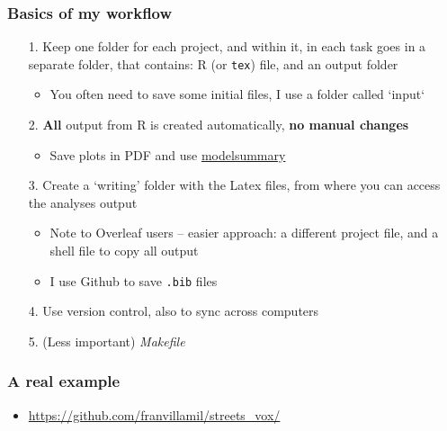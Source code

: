 \documentclass[utf8, xcolor=dvipsnames, handout]{beamer}
\begin{document}
\begin{itemize}
\begin{frame}
\end{frame}

\begin{frame}
\frametitle{Basics of my workflow}
\centering

\begin{itemize}
  \item[1.] Keep one folder for each project, and within it, in each task goes in a separate folder, that contains: R (or \texttt{tex}) file, and an output folder
  \begin{itemize}
    \item You often need to save some initial files, I use a folder called `input`
  \end{itemize}
  \item[2.] \textbf{All} output from R is created automatically, \textbf{no manual changes}
  \begin{itemize}
    \item Save plots in PDF and use \href{https://vincentarelbundock.github.io/modelsummary/articles/modelsummary.html}{modelsummary}
  \end{itemize}
  \item[3.] Create a `writing' folder with the Latex files, from where you can access the analyses output
  \begin{itemize}
    \item Note to Overleaf users -- easier approach: a different project file, and a shell file to copy all output
    \item I use Github to save \texttt{.bib} files
  \end{itemize}
  \item[4.] Use version control, also to sync across computers
  \item[5.] (Less important) \textit{Makefile}

\end{itemize}

\end{frame}

\begin{frame}
\frametitle{A real example}
\centering

\begin{itemize}
  \item \href{https://github.com/franvillamil/streets_vox/}{https://github.com/franvillamil/streets\_vox/}
\end{itemize}


\end{frame}
\end{itemize}
\end{document}
